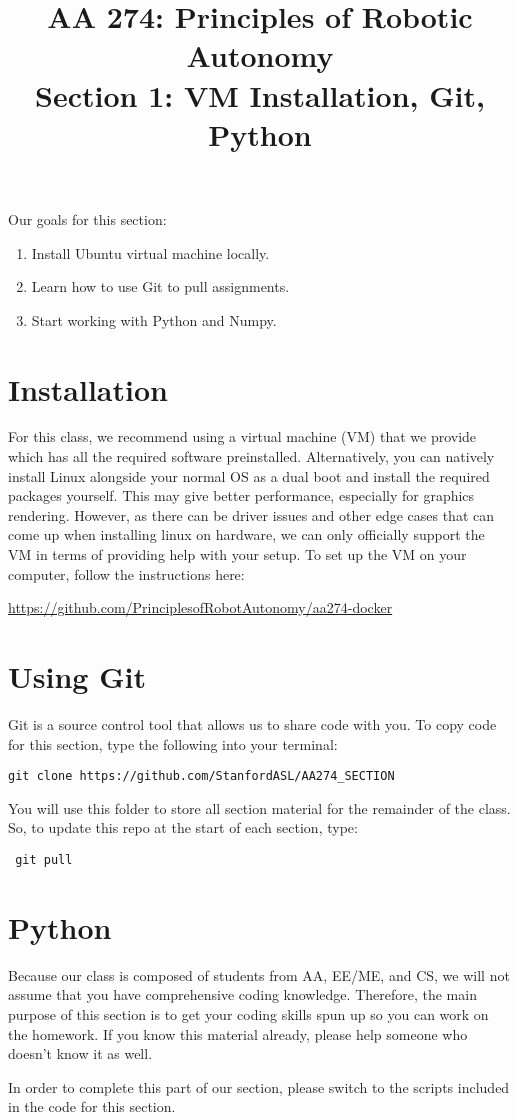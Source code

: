 \documentclass{article}
\title{AA 274: Principles of Robotic Autonomy \\ Section 1: VM Installation, Git, Python}
\date{}
\begin{document}
\maketitle
\pagestyle{fancy}

Our goals for this section: \begin{enumerate}
	\item Install Ubuntu virtual machine locally.
	\item Learn how to use Git to pull assignments.
	\item Start working with Python and Numpy.
\end{enumerate}


\section{Installation}
For this class, we recommend using a virtual machine (VM) that we provide which has all the
required software preinstalled.
Alternatively, you can natively install Linux alongside your normal OS as a dual boot and install the required
packages yourself. This may give better performance, especially for graphics rendering. However, as there
can be driver issues and other edge cases that can come up when installing linux on hardware, we can only
officially support the VM in terms of providing help with your setup.
To set up the VM on your computer, follow the instructions here: 

\href{https://github.com/PrinciplesofRobotAutonomy/aa274-docker}{https://github.com/PrinciplesofRobotAutonomy/aa274-docker}

\section{Using Git}
Git is a source control tool that allows us to share code with you. To copy code for this section, type the following into your terminal:

 \begin{lstlisting}[escapechar=|]
 git clone https://github.com/StanfordASL/AA274_SECTION
\end{lstlisting}

You will use this folder to store all section material for the remainder of the class. So, to update this repo at the start of each section, type: 

 \begin{lstlisting}
 git pull
\end{lstlisting}

\section{Python}
Because our class is composed of students from AA, EE/ME, and CS, we will not assume that you have comprehensive coding knowledge. Therefore, the main purpose of this section is to get your coding skills spun up so you can work on the homework. If you know this material already, please help someone who doesn't know it as well.


In order to complete this part of our section, please switch to the scripts included in the code for this section.
\end{document}
